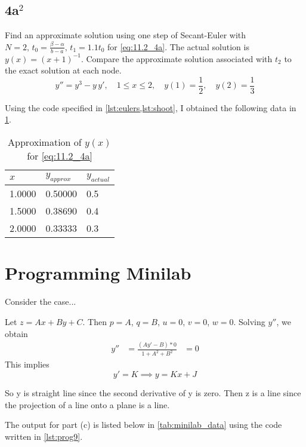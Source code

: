 \documentclass[12pt]{article}
\begin{document}
\subsection{4a$^2$}
Find an approximate solution using one step of Secant-Euler with
$N=2,\,t_0=\frac{\beta-\alpha}{b-a},\,t_1=1.1t_0$ for
\cref{eq:11.2_4a}. The actual solution is $y(x)=(x+1)^{-1}$. Compare
the approximate solution associated with $t_2$ to the exact solution
at each node.
\begin{equation}
  \label{eq:11.2_4a}
  y''=y^3-y\,y',\quad 1\leq x\leq 2,\quad y(1)=\frac{1}{2},\quad 
  y(2)=\frac{1}{3}
\end{equation}

Using the code specified in \cref{lst:eulers,lst:shoot}, I obtained the following
data in \cref{tab:4a_data}.
\begin{table}[hp]
  \centering
  \begin{tabularx}{.5\textwidth}{XXX}
    \hline
    $x$ & $y_{approx}$ & $y_{actual}$ \\
     \hline
     1.0000 &    0.50000 & 0.5 \\
     1.5000 &    0.38690 & 0.4 \\
     2.0000 &    0.33333 & 0.3 \\
    \hline           
  \end{tabularx}
  \caption{Approximation of $y(x)$ for \cref{eq:11.2_4a}}
  \label{tab:4a_data}
\end{table}

\pagebreak
\section{Programming Minilab}
Consider the case...

Let $z=Ax+By+C$. Then $p=A$, $q=B$, $u=0$, $v=0$, $w=0$. Solving $y''$, we obtain
\begin{equation}
  \label{eq:minilab_b}
  \begin{aligned}
    y''&=\frac{(Ay'-B)*0}{1+A^2+B^2}
    &=0
  \end{aligned}
\end{equation}
This implies 
\begin{equation}
  \label{eq:minilab_b_1}
  y'=K \implies y=Kx+J 
\end{equation}

So y is straight line since the second derivative of y is zero. Then z
is a line since the projection of a line onto a plane is a line.

The output for part (c) is listed below in \cref{tab:minilab_data}
using the code written in \cref{lst:prog9}.
\end{document}
